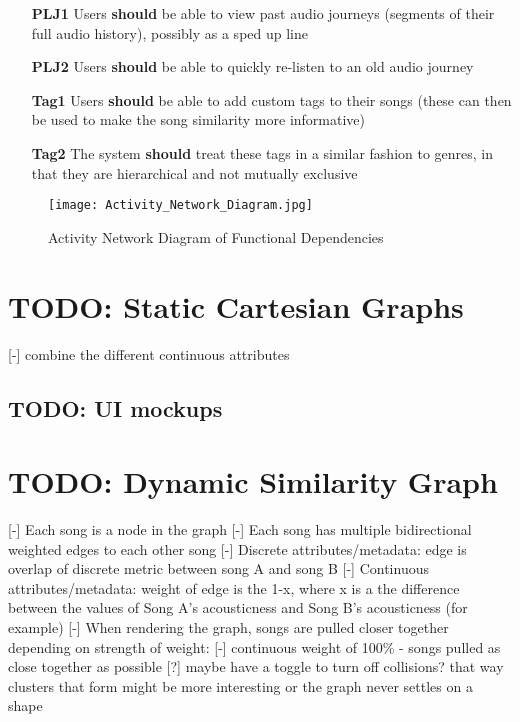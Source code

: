 \begin{itemize}
    \item[\textbf{PLJ1}] Users \textbf{should} be able to view past audio journeys (segments of their full audio history), possibly as a sped up line
    \item[\textbf{PLJ2}] Users \textbf{should} be able to quickly re-listen to an old audio journey
    \item[\textbf{Tag1}] Users \textbf{should} be able to add custom tags to their songs (these can then be used to make the song similarity more informative)
    \item[\textbf{Tag2}] The system \textbf{should} treat these tags in a similar fashion to genres, in that they are hierarchical and not mutually exclusive
\end{itemize}

\begin{figure}
    \texttt{[image: Activity\_Network\_Diagram.jpg]}
    \caption{Activity Network Diagram of Functional Dependencies}
\end{figure}


\section{TODO: Static Cartesian Graphs}
[-] combine the different continuous attributes
\subsection{TODO: UI mockups}

\section{TODO: Dynamic Similarity Graph}
[-] Each song is a node in the graph
[-] Each song has multiple bidirectional weighted edges to each other song
    [-] Discrete attributes/metadata: edge is overlap of discrete metric between song A and song B
    [-] Continuous attributes/metadata: weight of edge is the 1-x, where x is a the difference between the values of Song A's acousticness and Song B's acousticness (for example)
[-] When rendering the graph, songs are pulled closer together depending on strength of weight:
    [-] continuous weight of 100\% - songs pulled as close together as possible
[?] maybe have a toggle to turn off collisions? that way clusters that form might be more interesting or the graph never settles on a shape
